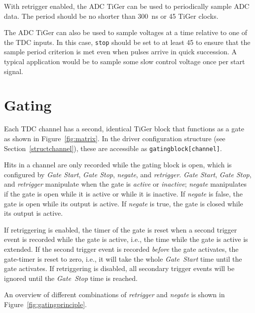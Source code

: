 {    With retrigger enabled, the ADC TiGer can be used to periodically
    sample ADC data.  The period should be no shorter than
    \SI{300}{\nano\second} or 45 TiGer clocks.

    The ADC TiGer can also be used to sample voltages at a time relative
    to one of the TDC inputs. In this case, \texttt{stop} should be set to
    at least 45 to ensure that the sample period criterion is met even
    when pulses arrive in quick succession. A typical application would be
    to sample some slow control voltage once per start signal.

    \newpage
    \label{cp:gating}
    \section{Gating}
    Each TDC channel has a second, identical TiGer block that functions as a
    gate as shown in Figure~\ref{fig:matrix}. In the driver configuration
    structure (see Section~\ref{structchannel}), these are accessible as
    \mbox{\texttt{gating\tu block[channel]}}.  

    Hits in a channel are only recorded while the gating block is open, which
    is configured by \emph{Gate Start}, \emph{Gate Stop}, \emph{negate}, and
    \emph{retrigger}.
    \emph{Gate Start}, \emph{Gate Stop}, and \emph{retrigger} manipulate when
    the gate is \emph{active} or \emph{inactive}; \emph{negate} manipulates 
    if the gate is open while it is active or while it is inactive.
    If \emph{negate} is false, the gate is open while its output is active.
    If \emph{negate} is true, the gate is closed while its output is active.
    
    If retriggering is enabled, the timer of the gate is reset when a second
    trigger event is recorded while the gate is active, i.e., the time while
    the gate is active is extended. If the second trigger event is recorded
    \textit{before} the gate activates, the gate-timer is reset to zero, i.e.,
    it will take the whole \textit{Gate~Start} time until the gate activates.
    If retriggering is disabled, all secondary trigger events will be ignored
    until the \textit{Gate~Stop} time is reached.

    An overview of different combinations of \emph{retrigger} and \emph{negate}
    is shown in Figure~\ref{fig:gatingprinciple}.

}
